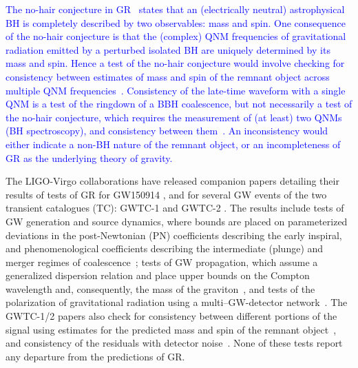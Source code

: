 \documentclass[twocolumn,prd,aps,superscriptaddress,preprintnumbers,tightenlines,showpacs,nofootinbib,eqsecnum,amsfonts,amsmath]{revtex4-1}
\begin{document}
\textcolor{blue}{The no-hair conjecture in GR~\cite{Israel:1967wq,Hawking:1971vc,Carter:1971zc,Robinson:1975bv,Mazur:1982db} states that an (electrically neutral) astrophysical BH is completely described by two observables: mass and spin. One
consequence of the no-hair conjecture is that the (complex) QNM
frequencies of gravitational radiation emitted by a perturbed isolated
BH are uniquely determined by its mass and spin. Hence
a test of the no-hair conjecture would involve checking for
consistency between estimates of mass and spin of the remnant object
across multiple QNM frequencies~\cite{Dreyer:2003bv,Berti:2005ys}.  Consistency of the late-time waveform with a single QNM is a test of the ringdown of
a BBH coalescence, but not necessarily a test of the no-hair
conjecture, which requires the measurement of (at least) two QNMs (BH
spectroscopy), and consistency between them~\cite{Dreyer:2003bv,Gossan:2011ha, Meidam:2014jpa,Carullo:2018sfu,Carullo:2018gah,Isi:2019aib,Bhagwat:2019bwv,Cabero:2019zyt,Maselli:2019mjd}. An inconsistency would either
indicate a non-BH nature of the remnant object, or an incompleteness
of GR as the underlying theory of gravity.}

The LIGO-Virgo collaborations have released companion papers detailing their results
of tests of GR for GW150914 \cite{TheLIGOScientific:2016src}, and for several GW events of
the two transient catalogues (TC): GWTC-1 \cite{LIGOScientific:2018mvr,LIGOScientific:2019fpa}  and GWTC-2 \cite{Abbott:2020niy,Abbott:2020jks}.
The results include tests of GW generation and source dynamics, where bounds are placed on
parameterized deviations in the post-Newtonian (PN) coefficients describing
the early inspiral, and
phenomenological coefficients describing the intermediate (plunge) and
merger regimes of coalescence~\cite{Arun:2006hn,Arun:2006yw,Agathos:2013upa,Abbott:2018lct}; tests of GW
propagation, which assume a generalized dispersion relation and place
upper bounds on the Compton wavelength and, consequently, the mass of
the graviton~\cite{Abbott:2017vtc,Samajdar:2017mka}, and tests of the
polarization of gravitational radiation using a
multi--GW-detector network~\cite{Abbott:2017oio,Isi:2017fbj}. The GWTC-1/2 papers also
check for consistency between different portions of the signal using estimates for the predicted mass and spin of the remnant
object~\cite{Ghosh:2016xx,Ghosh:2017gfp,TheLIGOScientific:2016src}, and
consistency of the residuals with detector noise~\cite{Ghonge:2020suv,LIGOScientific:2019fpa}. None of these tests report any
departure from the predictions of GR.
\end{document}
